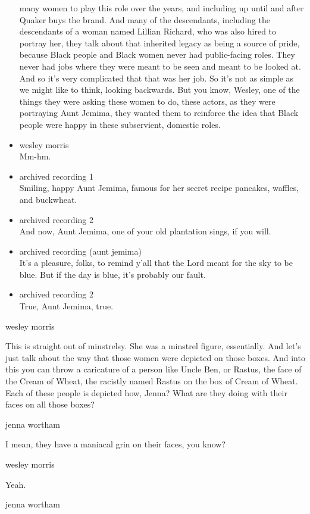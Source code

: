 \begin{itemize}
  many women to play this role over the years, and including up until
  and after Quaker buys the brand. And many of the descendants,
  including the descendants of a woman named Lillian Richard, who was
  also hired to portray her, they talk about that inherited legacy as
  being a source of pride, because Black people and Black women never
  had public-facing roles. They never had jobs where they were meant to
  be seen and meant to be looked at. And so it's very complicated that
  that was her job. So it's not as simple as we might like to think,
  looking backwards. But you know, Wesley, one of the things they were
  asking these women to do, these actors, as they were portraying Aunt
  Jemima, they wanted them to reinforce the idea that Black people were
  happy in these subservient, domestic roles.
\item
  wesley morris\\
  Mm-hm.
\item
  archived recording 1\\
  Smiling, happy Aunt Jemima, famous for her secret recipe pancakes,
  waffles, and buckwheat.
\item
  archived recording 2\\
  And now, Aunt Jemima, one of your old plantation sings, if you will.
\item
  archived recording (aunt jemima)\\
  It's a pleasure, folks, to remind y'all that the Lord meant for the
  sky to be blue. But if the day is blue, it's probably our fault.
\item
  archived recording 2\\
  True, Aunt Jemima, true.
\end{itemize}

wesley morris

This is straight out of minstrelsy. She was a minstrel figure,
essentially. And let's just talk about the way that those women were
depicted on those boxes. And into this you can throw a caricature of a
person like Uncle Ben, or Rastus, the face of the Cream of Wheat, the
racistly named Rastus on the box of Cream of Wheat. Each of these people
is depicted how, Jenna? What are they doing with their faces on all
those boxes?

jenna wortham

I mean, they have a maniacal grin on their faces, you know?

wesley morris

Yeah.

jenna wortham

